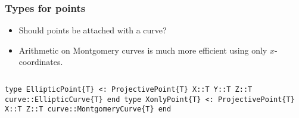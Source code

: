 \documentclass[12pt]{beamer}
\begin{document}
\begin{frame}
 \frametitle{Types for points}
 \begin{itemize}
  \item  Should points be attached with a curve?
  \item Arithmetic on Montgomery curves is much more efficient using only $x$-coordinates.
 \end{itemize}
 
 \pause
 \begin{center}
 \end{center}
 
 \begin{columns}
   \scriptsize\tt type EllipticPoint\{T\} <: ProjectivePoint\{T\}\newline
	X::T\newline
	Y::T\newline
	Z::T\newline
	curve::EllipticCurve\{T\} \newline
end
  \scriptsize\tt type XonlyPoint\{T\} <: ProjectivePoint\{T\}\newline
    X::T \newline
    Z::T \newline
    curve::MontgomeryCurve\{T\} \newline
end \newline
 \end{columns}
\end{frame}
\end{document}
